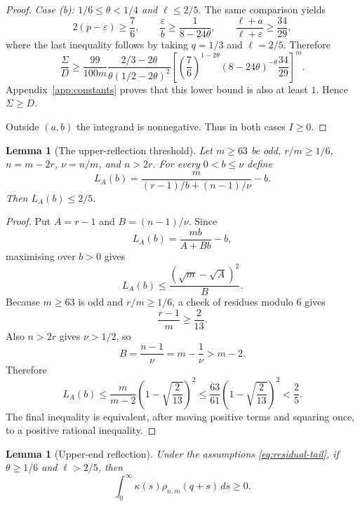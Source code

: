 \documentclass[11pt]{article}
\newtheorem{lemma}[theorem]{Lemma}
\begin{document}
\begin{proof}
\smallskip
\noindent\emph{Case (b): $1/6\le\theta<1/4$ and $\ell\le2/5$.}
The same comparison yields
\[
        2(p-\varepsilon)\ge\frac76,
        \qquad
        \frac{\varepsilon}{b}\ge\frac{1}{8-24\theta},
        \qquad
        \frac{\ell+a}{\ell+\varepsilon}\ge\frac{34}{29},
\]
where the last inequality follows by taking $q=1/3$ and $\ell=2/5$.  Therefore
\begin{equation}\label{eq:case-b-ratio}
        \frac{\Sigma}{D}
        \ge
        \frac{99}{100m}
        \frac{2/3-2\theta}{\theta(1/2-2\theta)^2}
        \left[
        \left(\frac76\right)^{1-2\theta}
        (8-24\theta)^{-\theta}
        \frac{34}{29}
        \right]^m .
\end{equation}
Appendix~\ref{app:constants} proves that this lower bound is also at least $1$.  Hence $\Sigma\ge D$.

Outside $(a,b)$ the integrand is nonnegative.  Thus in both cases $I\ge0$.
\end{proof}

\begin{lemma}[The upper-reflection threshold]\label{lem:upper-threshold}
Let $m\ge63$ be odd, $r/m\ge1/6$, $n=m-2r$, $\nu=n/m$, and $n>2r$.  For every $0<b\le\nu$ define
\[
        L_A(b)=\frac{m}{(r-1)/b+(n-1)/\nu}-b.
\]
Then $L_A(b)\le2/5$.
\end{lemma}

\begin{proof}
Put $A=r-1$ and $B=(n-1)/\nu$.  Since
\[
        L_A(b)=\frac{mb}{A+Bb}-b,
\]
maximising over $b>0$ gives
\[
        L_A(b)\le\frac{(\sqrt m-\sqrt A)^2}{B}.
\]
Because $m\ge63$ is odd and $r/m\ge1/6$, a check of residues modulo $6$ gives
\[
        \frac{r-1}{m}\ge\frac{2}{13}.
\]
Also $n>2r$ gives $\nu>1/2$, so
\[
        B=\frac{n-1}{\nu}=m-\frac1\nu>m-2.
\]
Therefore
\[
        L_A(b)\le
        \frac{m}{m-2}\left(1-\sqrt{\frac{2}{13}}\right)^2
        \le
        \frac{63}{61}\left(1-\sqrt{\frac{2}{13}}\right)^2
        <\frac25.
\]
The final inequality is equivalent, after moving positive terms and squaring once, to a positive rational inequality.
\end{proof}

\begin{lemma}[Upper-end reflection]\label{lem:upper-reflection-tail}
Under the assumptions \eqref{eq:residual-tail}, if $\theta\ge1/6$ and $\ell>2/5$, then
\[
        \int_0^\infty \kappa(s)\rho_{n,m}(q+s)\,ds\ge0.
\]
\end{lemma}
\end{document}
